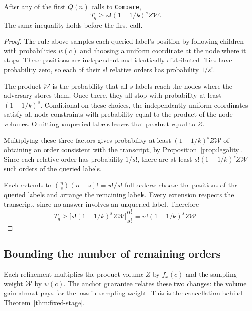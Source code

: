 \begin{lemma}\label{lem:packing}
After any of the first $Q(n)$ calls to \textnormal{\texttt{Compare}},
\[
T_q\ge n!(1-1/k)^s Z\mathcal W.
\]
The same inequality holds before the first call.
\end{lemma}
\begin{proof}
The rule above samples each queried label's position by following
children with probabilities $w(c)$ and choosing a uniform coordinate
at the node where it stops. These positions are independent and
identically distributed. Ties have probability zero, so each of their
$s!$ relative orders has probability $1/s!$.

The product $\mathcal W$ is the probability that all $s$ labels reach
the nodes where the adversary stores them. Once there, they all stop
with probability at least $(1-1/k)^s$. Conditional on these choices,
the independently uniform coordinates satisfy all node constraints with
probability equal to the product of the node volumes. Omitting unqueried
labels leaves that product equal to $Z$.

Multiplying these three factors gives probability at least
$(1-1/k)^s Z\mathcal W$ of obtaining an order consistent with the
transcript, by Proposition~\ref{prop:legality}. Since each relative order
has probability $1/s!$, there are at least $s!(1-1/k)^s Z\mathcal W$
such orders of the queried labels.

Each extends to $\binom ns(n-s)!=n!/s!$ full orders: choose the positions
of the queried labels and arrange the remaining labels. Every extension
respects the transcript, since no answer involves an unqueried label.
Therefore
\[
T_q\ge \bigl[s!(1-1/k)^s Z\mathcal W\bigr]\frac{n!}{s!}
    =n!(1-1/k)^s Z\mathcal W.
\]
\end{proof}

\subsection{Bounding the number of remaining orders}\label{sec:comparison-cost}

Each refinement multiplies the product volume $Z$ by $f_x(c)$ and the
sampling weight $\mathcal W$ by $w(c)$. The anchor guarantee relates
these two changes: the volume gain almost pays for the loss in sampling
weight. This is the cancellation behind Theorem~\ref{thm:fixed-stage}.

